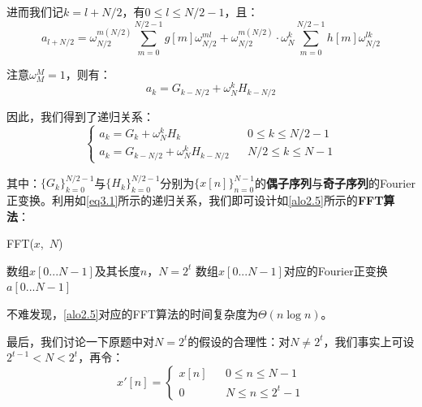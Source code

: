 \documentclass[12pt,a4paper,violet,oneside]{bbe}
\begin{document}
进而我们记$k=l+N/2$，有$0\leqslant l\leqslant N/2-1$，且：
$$
a_{l+N/2}=\omega_{N/2}^{m(N/2)}\sum\limits_{m=0}^{N/2-1}g[m]\omega_{N/2}^{ml}+\omega_{N/2}^{m(N/2)}\cdot\omega_N^{k}\sum\limits_{m=0}^{N/2-1}h[m]\omega_{N/2}^{lk}
$$

注意$\omega_{M}^{M}=1$，则有：
$$
a_k=G_{k-N/2}+\omega_N^{k}H_{k-N/2}
$$

因此，我们得到了递归关系：
\begin{equation}
	\left\{\begin{array}{lcl}
		a_k=G_k+\omega_N^{k}H_k&&0\leqslant k\leqslant N/2-1\\
		
		a_k=G_{k-N/2}+\omega_N^{k}H_{k-N/2}&&N/2\leqslant k\leqslant N-1
	\end{array}\right.
\label{eq3.1}
\end{equation}

其中：$\{G_k\}_{k=0}^{N/2-1}$与$\{H_k\}_{k=0}^{N/2-1}$分别为$\{x[n]\}_{n=0}^{N-1}$的\textbf{偶子序列}与\textbf{奇子序列}的Fourier正变换。利用如\cref{eq3.1}所示的递归关系，我们即可设计如\cref{alo2.5}所示的\textbf{FFT算法}：
\\
\begin{algorithm}[H]
	\caption{FFT($x$,~$N$)}
	\label{alo2.5}
	\begin{algorithmic}[1] 
		\Require 数组$x[0...N-1]$及其长度$n$，$N=2^t$
		\Ensure  数组$x[0...N-1]$对应的Fourier正变换$a[0...N-1]$
		\textcolor{blue}{}
		\EndIf
	\textcolor{blue}{}
	\EndFor
	\end{algorithmic} 
\end{algorithm}

不难发现，\cref{alo2.5}对应的FFT算法的时间复杂度为$\Theta(n\log n)$。

最后，我们讨论一下原题中对$N=2^t$的假设的合理性：对$N\ne 2^t$，我们事实上可设$2^{t-1}<N<2^t$，再令：
$$
x'[n]=\left\{\begin{array}{lcl}
	x[n]&&0\leqslant n\leqslant N-1\\
	0&&N\leqslant n\leqslant 2^t-1
\end{array}\right.
$$
\end{document}
